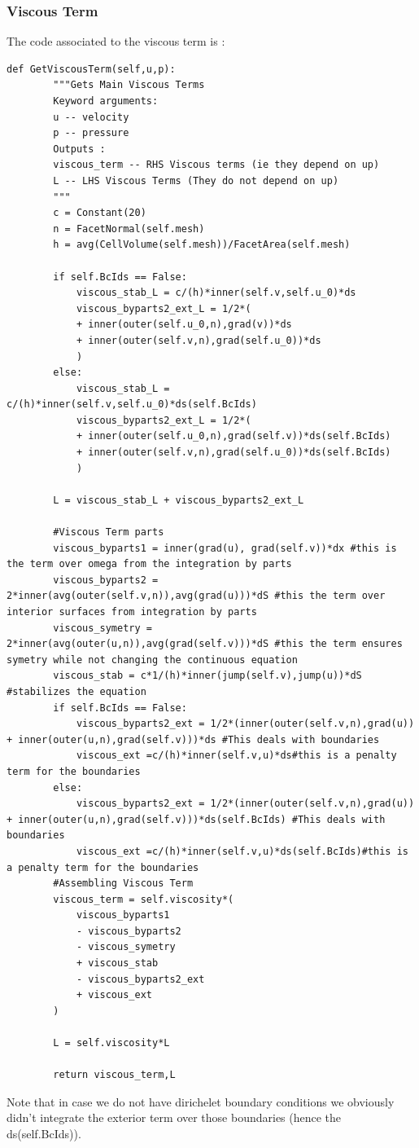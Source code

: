 \documentclass[11pt,twoside,a4paper]{article}
\begin{document}
\subsubsection{Viscous Term}
The code associated to the viscous term is :
\begin{lstlisting}
def GetViscousTerm(self,u,p):
        """Gets Main Viscous Terms
        Keyword arguments:
        u -- velocity
        p -- pressure
        Outputs :
        viscous_term -- RHS Viscous terms (ie they depend on up)
        L -- LHS Viscous Terms (They do not depend on up)
        """
        c = Constant(20)
        n = FacetNormal(self.mesh)
        h = avg(CellVolume(self.mesh))/FacetArea(self.mesh)

        if self.BcIds == False:
            viscous_stab_L = c/(h)*inner(self.v,self.u_0)*ds
            viscous_byparts2_ext_L = 1/2*(
            + inner(outer(self.u_0,n),grad(v))*ds
            + inner(outer(self.v,n),grad(self.u_0))*ds
            )
        else:
            viscous_stab_L = c/(h)*inner(self.v,self.u_0)*ds(self.BcIds)
            viscous_byparts2_ext_L = 1/2*(
            + inner(outer(self.u_0,n),grad(self.v))*ds(self.BcIds)
            + inner(outer(self.v,n),grad(self.u_0))*ds(self.BcIds)
            )

        L = viscous_stab_L + viscous_byparts2_ext_L

        #Viscous Term parts
        viscous_byparts1 = inner(grad(u), grad(self.v))*dx #this is the term over omega from the integration by parts
        viscous_byparts2 = 2*inner(avg(outer(self.v,n)),avg(grad(u)))*dS #this the term over interior surfaces from integration by parts
        viscous_symetry = 2*inner(avg(outer(u,n)),avg(grad(self.v)))*dS #this the term ensures symetry while not changing the continuous equation
        viscous_stab = c*1/(h)*inner(jump(self.v),jump(u))*dS #stabilizes the equation
        if self.BcIds == False:
            viscous_byparts2_ext = 1/2*(inner(outer(self.v,n),grad(u)) + inner(outer(u,n),grad(self.v)))*ds #This deals with boundaries
            viscous_ext =c/(h)*inner(self.v,u)*ds#this is a penalty term for the boundaries
        else:
            viscous_byparts2_ext = 1/2*(inner(outer(self.v,n),grad(u)) + inner(outer(u,n),grad(self.v)))*ds(self.BcIds) #This deals with boundaries
            viscous_ext =c/(h)*inner(self.v,u)*ds(self.BcIds)#this is a penalty term for the boundaries
        #Assembling Viscous Term
        viscous_term = self.viscosity*(
            viscous_byparts1
            - viscous_byparts2
            - viscous_symetry
            + viscous_stab
            - viscous_byparts2_ext
            + viscous_ext
        )

        L = self.viscosity*L

        return viscous_term,L
\end{lstlisting}
Note that in case we do not have dirichelet boundary conditions we obviously didn't integrate the exterior term over those boundaries (hence the ds(self.BcIds)).
\end{document}
